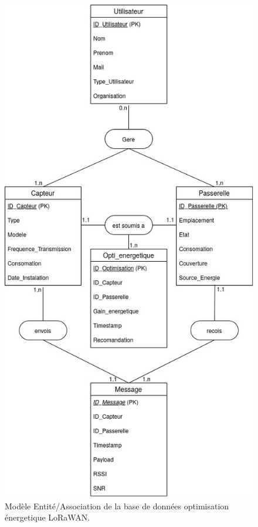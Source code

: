 \documentclass[
	a4paper, %
	11pt, %
	unnumberedsections, %
	twoside, %
    xcolor = {dvipsnames}
]{class}
\begin{document}
\begin{figure}[H] %
    \begin{center}
        \includegraphics[height=2.5\columnwidth]{assets/LoRaWAN-db.jpg}
        \caption{Modèle Entité/Association de la base de données optimisation \'energetique LoRaWAN.}
        \label{fig:e/a LoRaWAN-db} 
    \end{center}
\end{figure}
\end{document}
